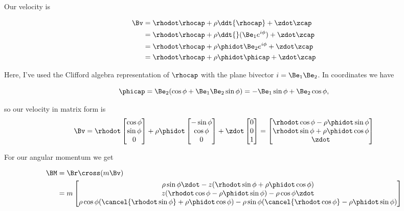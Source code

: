Our velocity is

\begin{align*}
\Bv
&= \rhodot \rhocap + \rho \ddt{\rhocap} + \zdot \zcap \\
&= \rhodot \rhocap + \rho \ddt{}(\Be_1 e^{i\phi}) + \zdot \zcap \\
&= \rhodot \rhocap + \rho \phidot \Be_2 e^{i\phi} + \zdot \zcap \\
&= \rhodot \rhocap + \rho \phidot \phicap + \zdot \zcap \\
\end{align*}

Here, I've used the Clifford algebra representation of $\rhocap$ with the plane bivector $i = \Be_1 \Be_2$.  In coordinates we have

\begin{equation}\label{eqn:classicalMechanicsPs2:110}
\phicap = \Be_2 (\cos\phi + \Be_1 \Be_2 \sin\phi) = -\Be_1 \sin\phi + \Be_2 \cos\phi,
\end{equation}

so our velocity in matrix form is
\begin{equation}\label{eqn:classicalMechanicsPs2:130}
\Bv = \rhodot
\begin{bmatrix}
\cos\phi \\
\sin\phi \\
0
\end{bmatrix}
+
\rho \phidot
\begin{bmatrix}
-\sin\phi \\
\cos\phi \\
0
\end{bmatrix}
+
\zdot
\begin{bmatrix}
0 \\
0 \\
1
\end{bmatrix}
=
\begin{bmatrix}
\rhodot \cos\phi - \rho \phidot \sin\phi \\
\rhodot \sin\phi + \rho \phidot \cos\phi \\
\zdot
\end{bmatrix}
\end{equation}

For our angular momentum we get

\begin{align*}
\BM
&= \Br \cross (m \Bv) \\
&=
m
\begin{bmatrix}
\rho\sin\phi \zdot - z (\rhodot \sin\phi + \rho \phidot \cos\phi) \\
z (\rhodot \cos\phi - \rho \phidot \sin\phi) - \rho \cos\phi \zdot \\
\rho \cos\phi (\cancel{\rhodot \sin\phi} + \rho \phidot \cos\phi) - \rho\sin\phi (\cancel{\rhodot \cos\phi} - \rho \phidot \sin\phi)
\end{bmatrix} \\
\end{align*}

